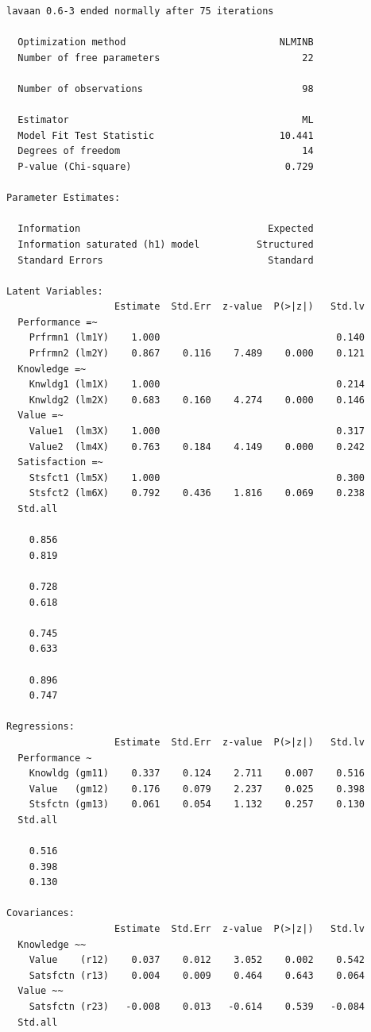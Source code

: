 \begin{verbatim}
lavaan 0.6-3 ended normally after 75 iterations

  Optimization method                           NLMINB
  Number of free parameters                         22

  Number of observations                            98

  Estimator                                         ML
  Model Fit Test Statistic                      10.441
  Degrees of freedom                                14
  P-value (Chi-square)                           0.729

Parameter Estimates:

  Information                                 Expected
  Information saturated (h1) model          Structured
  Standard Errors                             Standard

Latent Variables:
                   Estimate  Std.Err  z-value  P(>|z|)   Std.lv
  Performance =~                                               
    Prfrmn1 (lm1Y)    1.000                               0.140
    Prfrmn2 (lm2Y)    0.867    0.116    7.489    0.000    0.121
  Knowledge =~                                                 
    Knwldg1 (lm1X)    1.000                               0.214
    Knwldg2 (lm2X)    0.683    0.160    4.274    0.000    0.146
  Value =~                                                     
    Value1  (lm3X)    1.000                               0.317
    Value2  (lm4X)    0.763    0.184    4.149    0.000    0.242
  Satisfaction =~                                              
    Stsfct1 (lm5X)    1.000                               0.300
    Stsfct2 (lm6X)    0.792    0.436    1.816    0.069    0.238
  Std.all
         
    0.856
    0.819
         
    0.728
    0.618
         
    0.745
    0.633
         
    0.896
    0.747

Regressions:
                   Estimate  Std.Err  z-value  P(>|z|)   Std.lv
  Performance ~                                                
    Knowldg (gm11)    0.337    0.124    2.711    0.007    0.516
    Value   (gm12)    0.176    0.079    2.237    0.025    0.398
    Stsfctn (gm13)    0.061    0.054    1.132    0.257    0.130
  Std.all
         
    0.516
    0.398
    0.130

Covariances:
                   Estimate  Std.Err  z-value  P(>|z|)   Std.lv
  Knowledge ~~                                                 
    Value    (r12)    0.037    0.012    3.052    0.002    0.542
    Satsfctn (r13)    0.004    0.009    0.464    0.643    0.064
  Value ~~                                                     
    Satsfctn (r23)   -0.008    0.013   -0.614    0.539   -0.084
  Std.all
         

\end{verbatim}
